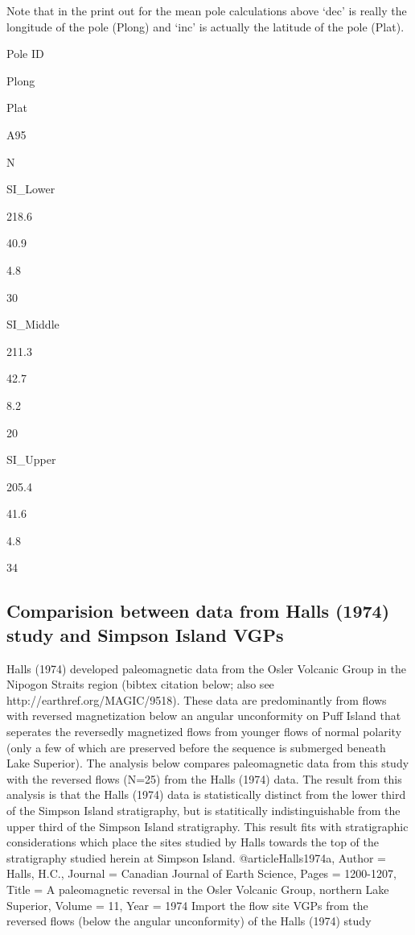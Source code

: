 \documentclass[letterpaper,10pt,english]{/Users/polarwander/Library/Enthought/Canopy_64bit/User/lib/python2.7/site-packages/sphinx/texinputs/sphinxhowto}
\begin{document}
        
    
Note that in the print out for the mean pole calculations above `dec' is
really the longitude of the pole (Plong) and `inc' is actually the
latitude of the pole (Plat).

Pole ID

Plong

Plat

A95

N

SI\_Lower

218.6

40.9

4.8

30

SI\_Middle

211.3

42.7

8.2

20

SI\_Upper

205.4

41.6

4.8

34\subsection{Comparision between data from Halls (1974) study and Simpson Island VGPs}Halls (1974) developed paleomagnetic data from the Osler Volcanic Group
in the Nipogon Straits region (bibtex citation below; also see
http://earthref.org/MAGIC/9518). These data are predominantly from flows
with reversed magnetization below an angular unconformity on Puff Island
that seperates the reversedly magnetized flows from younger flows of
normal polarity (only a few of which are preserved before the sequence
is submerged beneath Lake Superior). The analysis below compares
paleomagnetic data from this study with the reversed flows (N=25) from
the Halls (1974) data. The result from this analysis is that the Halls
(1974) data is statistically distinct from the lower third of the
Simpson Island stratigraphy, but is statitically indistinguishable from
the upper third of the Simpson Island stratigraphy. This result fits
with stratigraphic considerations which place the sites studied by Halls
towards the top of the stratigraphy studied herein at Simpson Island.
@article{Halls1974a,
        Author = {Halls, H.C.},
        Journal = {Canadian Journal of Earth Science},
        Pages = {1200-1207},
        Title = {A paleomagnetic reversal in the {O}sler {V}olcanic
{G}roup, northern {L}ake {S}uperior},
        Volume = {11},
        Year = {1974}}
Import the flow site VGPs from the reversed flows (below the angular
unconformity) of the Halls (1974) study
\end{document}
